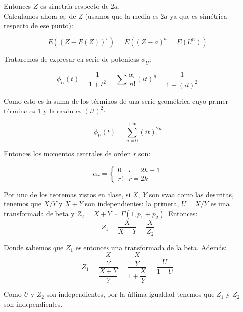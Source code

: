 \documentclass[openany]{book}
\begin{document}
\begin{exercise}
    Entonces $ Z $ es simetría respecto de $ 2a $.\\ 

    Calculamos ahora $ \alpha_{r} $ de $ Z $ (usamos que la media es $ 2a $ ya que es simétrica respecto de ese punto):

    $$ E((Z-E(Z))^{n}) = E((Z-a)^{n} = E(U^{n})) $$

    Trataremos de expresar en serie de potenicas $ \phi_{U} $:

    $$ \phi_{U}(t) = \dfrac{1}{1+t^2} = \sum\limits_{}^{} \dfrac{\alpha_n}{n!}(it)^{n} = \dfrac{1}{1-(it)^2} $$

    Como esto es la suma de los términos de una serie geométrica cuyo primer término es 1 y la razón es $ (it)^2 $:

    $$ \phi_{U}(t) = \sum\limits_{n=0}^{+\infty}(it)^{2n} $$

    Entonces los momentos centrales de orden $ r $ son:

    $$ \alpha_{r} = \left\{
    \begin{array}{ll}
        0 & r=2k+1 \\ 
        r! & r = 2k
    \end{array}
    \right. $$

\end{exercise}

\begin{exercise}
    $  $\\ 
    Por uno de los teoremas vistos en clase, si $ X,\ Y $ son vvaa como las descritas, tenemos que $ X/Y $ y $ X+Y $ son independientes: la primera, $ U=X/Y $ es una transformada de beta y $ Z_2=X+Y\sim \Gamma(1,p_1+p_2) $. Entonces:
    $$ Z_1 = \dfrac{X}{X+Y} = \dfrac{X}{Z_2} $$
    
    Donde sabemos que $ Z_1 $ es entonces una transformada de la beta. Además:
    $$ Z_1 = \dfrac{\dfrac{X}{Y}}{\dfrac{X+Y}{Y}} = \dfrac{\dfrac{X}{Y}}{1+\dfrac{X}{Y}} = \dfrac{U}{1+U}$$

    Como $ U $ y $ Z_2 $ son independientes, por la última igualdad tenemos que $ Z_1 $ y $ Z_2 $ son independientes.
\end{exercise}
\end{document}
